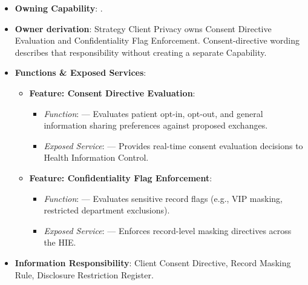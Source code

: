 \begin{itemize}

\item
\textbf{Owning Capability}: \texttt{}.



\item
\textbf{Owner derivation}: Strategy Client Privacy owns Consent Directive Evaluation and Confidentiality Flag Enforcement. Consent-directive wording describes that responsibility without creating a separate Capability.



\item
\textbf{Functions \& Exposed Services}:


\begin{itemize}

\item
\textbf{Feature: Consent Directive Evaluation}:


\begin{itemize}

\item
\emph{Function}: \texttt{} — Evaluates patient opt-in, opt-out, and general information sharing preferences against proposed exchanges.



\item
\emph{Exposed Service}: \texttt{} — Provides real-time consent evaluation decisions to Health Information Control.



\end{itemize}


\item
\textbf{Feature: Confidentiality Flag Enforcement}:


\begin{itemize}

\item
\emph{Function}: \texttt{} — Evaluates sensitive record flags (e.g., VIP masking, restricted department exclusions).



\item
\emph{Exposed Service}: \texttt{} — Enforces record-level masking directives across the HIE.



\end{itemize}


\end{itemize}


\item
\textbf{Information Responsibility}: Client Consent Directive, Record Masking Rule, Disclosure Restriction Register.



\end{itemize}
\label{rad:em:80}

